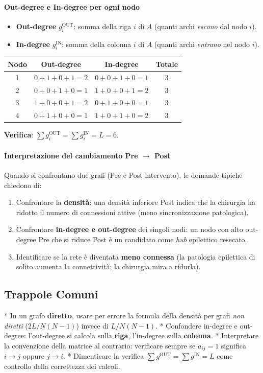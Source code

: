 \documentclass[10pt, letterpaper]{report}
\begin{document}
\paragraph{Out-degree e In-degree per ogni nodo}
\begin{itemize}
    \item \textbf{Out-degree} $g_i^{\text{OUT}}$: somma della riga $i$ di $A$ (quanti archi \emph{escono} dal nodo $i$).
    \item \textbf{In-degree} $g_i^{\text{IN}}$: somma della colonna $i$ di $A$ (quanti archi \emph{entrano} nel nodo $i$).
\end{itemize}
\begin{center}
\renewcommand{\arraystretch}{1.4}
\begin{tabular}{cccc}
\toprule
Nodo & Out-degree & In-degree & Totale \\
\midrule
1 & $0+1+0+1=2$ & $0+0+1+0=1$ & 3 \\
2 & $0+0+1+0=1$ & $1+0+0+1=2$ & 3 \\
3 & $1+0+0+1=2$ & $0+1+0+0=1$ & 3 \\
4 & $0+1+0+0=1$ & $1+0+1+0=2$ & 3 \\
\bottomrule
\end{tabular}
\renewcommand{\arraystretch}{1.0}
\end{center}
\textbf{Verifica}: $\sum g_i^{\text{OUT}} = \sum g_i^{\text{IN}} = L = 6$.

\paragraph{Interpretazione del cambiamento Pre $\to$ Post}
Quando si confrontano due grafi (Pre e Post intervento), le domande tipiche chiedono di:
\begin{enumerate}
    \item Confrontare la \textbf{densità}: una densità inferiore Post indica che la chirurgia ha ridotto il numero di connessioni attive (meno sincronizzazione patologica).
    \item Confrontare \textbf{in-degree e out-degree} dei singoli nodi: un nodo con alto out-degree Pre che si riduce Post è un candidato come \emph{hub} epilettico resecato.
    \item Identificare se la rete è diventata \textbf{meno connessa} (la patologia epilettica di solito aumenta la connettività; la chirurgia mira a ridurla).
\end{enumerate}

\subsection*{Trappole Comuni}
* In un grafo \textbf{diretto}, usare per errore la formula della densità per grafi \emph{non diretti} ($2L / N(N-1)$) invece di $L / N(N-1)$.
* Confondere in-degree e out-degree: l'out-degree si calcola sulla \textbf{riga}, l'in-degree sulla \textbf{colonna}.
* Interpretare la convenzione della matrice al contrario: verificare sempre se $a_{ij} = 1$ significa $i \to j$ oppure $j \to i$.
* Dimenticare la verifica $\sum g^{\text{OUT}} = \sum g^{\text{IN}} = L$ come controllo della correttezza dei calcoli.
\end{document}
